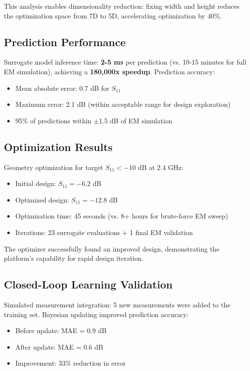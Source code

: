 \documentclass[conference]{IEEEtran}
\begin{document}
This analysis enables dimensionality reduction: fixing width and height reduces the optimization space from 7D to 5D, accelerating optimization by 40\%.

\subsection{Prediction Performance}
Surrogate model inference time: \textbf{2-5 ms} per prediction (vs. 10-15 minutes for full EM simulation), achieving a \textbf{180,000x speedup}. Prediction accuracy:
\begin{itemize}
    \item Mean absolute error: 0.7 dB for $S_{11}$
    \item Maximum error: 2.1 dB (within acceptable range for design exploration)
    \item 95\% of predictions within $\pm$1.5 dB of EM simulation
\end{itemize}

\subsection{Optimization Results}
Geometry optimization for target $S_{11} < -10$ dB at 2.4 GHz:
\begin{itemize}
    \item Initial design: $S_{11} = -6.2$ dB
    \item Optimized design: $S_{11} = -12.8$ dB
    \item Optimization time: 45 seconds (vs. 8+ hours for brute-force EM sweep)
    \item Iterations: 23 surrogate evaluations + 1 final EM validation
\end{itemize}

The optimizer successfully found an improved design, demonstrating the platform's capability for rapid design iteration.

\subsection{Closed-Loop Learning Validation}
Simulated measurement integration: 5 new measurements were added to the training set. Bayesian updating improved prediction accuracy:
\begin{itemize}
    \item Before update: MAE = 0.9 dB
    \item After update: MAE = 0.6 dB
    \item Improvement: 33\% reduction in error
\end{itemize}
\end{document}
